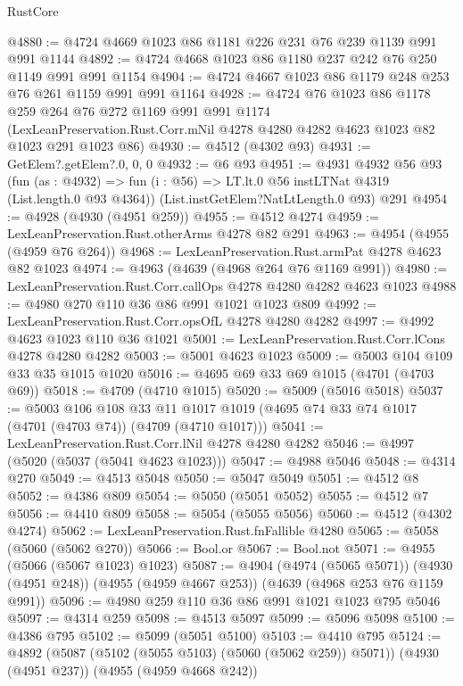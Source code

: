 \begin{lexlean}{RustCore}
\begin{coremodule}
@4880 := @4724 @4669 @1023 @86 @1181 @226 @231 @76 @239 @1139 @991 @991 @1144
@4892 := @4724 @4668 @1023 @86 @1180 @237 @242 @76 @250 @1149 @991 @991 @1154
@4904 := @4724 @4667 @1023 @86 @1179 @248 @253 @76 @261 @1159 @991 @991 @1164
@4928 := @4724
    @76
    @1023
    @86
    @1178
    @259
    @264
    @76
    @272
    @1169
    @991
    @991
    @1174
    (LexLeanPreservation.Rust.Corr.mNil @4278 @4280 @4282 @4623 @1023 @82 @1023 @291 @1023 @86)
@4930 := @4512 (@4302 @93)
@4931 := GetElem?.getElem?.{0, 0, 0}
@4932 := @6 @93
@4951 := @4931
    @4932
    @56
    @93
    (fun (as : @4932) => fun (i : @56) => LT.lt.{0} @56 instLTNat @4319 (List.length.{0} @93 @4364))
    (List.instGetElem?NatLtLength.{0} @93)
    @291
@4954 := @4928 (@4930 (@4951 @259))
@4955 := @4512 @4274
@4959 := LexLeanPreservation.Rust.otherArms @4278 @82 @291
@4963 := @4954 (@4955 (@4959 @76 @264))
@4968 := LexLeanPreservation.Rust.armPat @4278 @4623 @82 @1023
@4974 := @4963 (@4639 (@4968 @264 @76 @1169 @991))
@4980 := LexLeanPreservation.Rust.Corr.callOps @4278 @4280 @4282 @4623 @1023
@4988 := @4980 @270 @110 @36 @86 @991 @1021 @1023 @809
@4992 := LexLeanPreservation.Rust.Corr.opsOfL @4278 @4280 @4282
@4997 := @4992 @4623 @1023 @110 @36 @1021
@5001 := LexLeanPreservation.Rust.Corr.lCons @4278 @4280 @4282
@5003 := @5001 @4623 @1023
@5009 := @5003 @104 @109 @33 @35 @1015 @1020
@5016 := @4695 @69 @33 @69 @1015 (@4701 (@4703 @69))
@5018 := @4709 (@4710 @1015)
@5020 := @5009 (@5016 @5018)
@5037 := @5003
    @106
    @108
    @33
    @11
    @1017
    @1019
    (@4695 @74 @33 @74 @1017 (@4701 (@4703 @74)) (@4709 (@4710 @1017)))
@5041 := LexLeanPreservation.Rust.Corr.lNil @4278 @4280 @4282
@5046 := @4997 (@5020 (@5037 (@5041 @4623 @1023)))
@5047 := @4988 @5046
@5048 := @4314 @270
@5049 := @4513 @5048
@5050 := @5047 @5049
@5051 := @4512 @8
@5052 := @4386 @809
@5054 := @5050 (@5051 @5052)
@5055 := @4512 @7
@5056 := @4410 @809
@5058 := @5054 (@5055 @5056)
@5060 := @4512 (@4302 @4274)
@5062 := LexLeanPreservation.Rust.fnFallible @4280
@5065 := @5058 (@5060 (@5062 @270))
@5066 := Bool.or
@5067 := Bool.not
@5071 := @4955 (@5066 (@5067 @1023) @1023)
@5087 := @4904
    (@4974 (@5065 @5071))
    (@4930 (@4951 @248))
    (@4955 (@4959 @4667 @253))
    (@4639 (@4968 @253 @76 @1159 @991))
@5096 := @4980 @259 @110 @36 @86 @991 @1021 @1023 @795 @5046
@5097 := @4314 @259
@5098 := @4513 @5097
@5099 := @5096 @5098
@5100 := @4386 @795
@5102 := @5099 (@5051 @5100)
@5103 := @4410 @795
@5124 := @4892
    (@5087 (@5102 (@5055 @5103) (@5060 (@5062 @259)) @5071))
    (@4930 (@4951 @237))
    (@4955 (@4959 @4668 @242))

\end{coremodule}
\end{lexlean}
